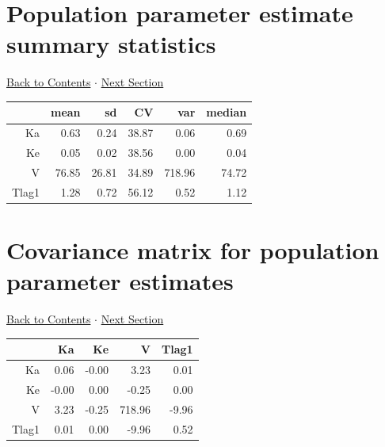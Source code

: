 \documentclass{article}
\begin{document}
          \section{Population parameter estimate summary statistics} 
 \hyperlink{tableofcontents}{Back to Contents} $\cdot$ \hyperlink{covforppe}{Next Section} \newline
          \newline 
\begin{tabular}{rrrrrr}
  \hline
 & mean & sd & CV & var & median \\ 
  \hline
Ka & 0.63 & 0.24 & 38.87 & 0.06 & 0.69 \\ 
  Ke & 0.05 & 0.02 & 38.56 & 0.00 & 0.04 \\ 
  V & 76.85 & 26.81 & 34.89 & 718.96 & 74.72 \\ 
  Tlag1 & 1.28 & 0.72 & 56.12 & 0.52 & 1.12 \\ 
   \hline
\end{tabular}
\newpage
          
          \hypertarget{covforppe}{}
          
          \section{Covariance matrix for population parameter estimates} 
 \hyperlink{tableofcontents}{Back to Contents} $\cdot$ \hyperlink{corforppe}{Next Section} \newline
          \newline 
\begin{tabular}{rrrrr}
  \hline
 & Ka & Ke & V & Tlag1 \\ 
  \hline
Ka & 0.06 & -0.00 & 3.23 & 0.01 \\ 
  Ke & -0.00 & 0.00 & -0.25 & 0.00 \\ 
  V & 3.23 & -0.25 & 718.96 & -9.96 \\ 
  Tlag1 & 0.01 & 0.00 & -9.96 & 0.52 \\ 
   \hline
\end{tabular}

          \hypertarget{corforppe}{}
          
\end{document}
